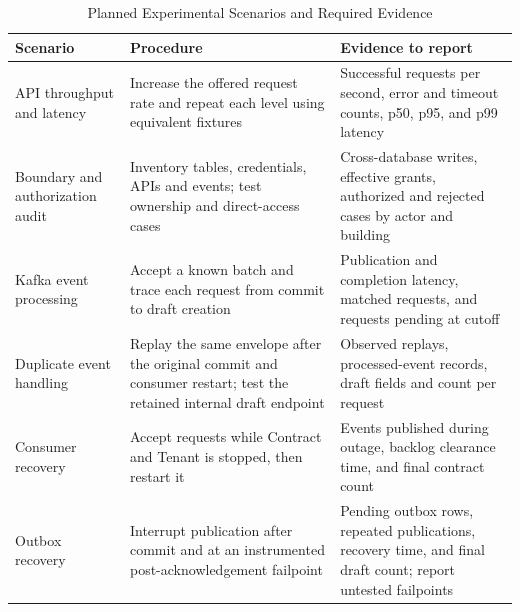 \begin{table}[t]
\caption{Planned Experimental Scenarios and Required Evidence}
\label{tab:experiments}
\centering\footnotesize
\begin{tabularx}{\textwidth}{@{}p{}X X@{}}
\toprule
Scenario & Procedure & Evidence to report \\
\midrule
API throughput and latency & Increase the offered request rate and repeat each level using equivalent fixtures & Successful requests per second, error and timeout counts, p50, p95, and p99 latency \\
Boundary and authorization audit & Inventory tables, credentials, APIs and events; test ownership and direct-access cases & Cross-database writes, effective grants, authorized and rejected cases by actor and building \\
Kafka event processing & Accept a known batch and trace each request from commit to draft creation & Publication and completion latency, matched requests, and requests pending at cutoff \\
Duplicate event handling & Replay the same envelope after the original commit and consumer restart; test the retained internal draft endpoint & Observed replays, processed-event records, draft fields and count per request \\
Consumer recovery & Accept requests while Contract and Tenant is stopped, then restart it & Events published during outage, backlog clearance time, and final contract count \\
Outbox recovery & Interrupt publication after commit and at an instrumented post-acknowledgement failpoint & Pending outbox rows, repeated publications, recovery time, and final draft count; report untested failpoints \\
\bottomrule
\end{tabularx}
\end{table}
